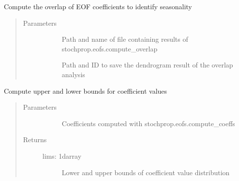\documentclass[letterpaper,10pt,english]{sphinxmanual}
\begin{document}
\begin{fulllineitems}
\label{\detokenize{stochprop.eofs:stochprop.eofs.compute_seasonality}}
Compute the overlap of EOF coefficients to identify seasonality
\begin{quote}\begin{description}
\item[{Parameters}] \leavevmode\begin{description}
\item[{}] \leavevmode
Path and name of file containing results of stochprop.eofs.compute\_overlap

\item[{}] \leavevmode
Path and ID to save the dendrogram result of the overlap analysis

\end{description}

\end{description}\end{quote}

\end{fulllineitems}


\begin{fulllineitems}
\label{\detokenize{stochprop.eofs:stochprop.eofs.define_coeff_limits}}
Compute upper and lower bounds for coefficient values
\begin{quote}\begin{description}
\item[{Parameters}] \leavevmode\begin{description}
\item[{}] \leavevmode
Coefficients computed with stochprop.eofs.compute\_coeffs

\end{description}

\item[{Returns}] \leavevmode\begin{description}
\item[{lims: 1darray}] \leavevmode
Lower and upper bounds of coefficient value distribution

\end{description}

\end{description}\end{quote}

\end{fulllineitems}
\end{document}
